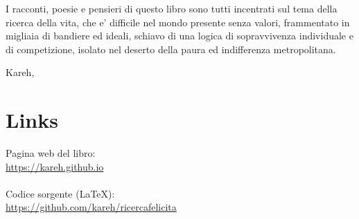 I racconti, poesie e pensieri di questo libro sono tutti incentrati sul tema della ricerca della vita, che e' difficile nel mondo presente senza valori, frammentato in migliaia di bandiere ed ideali, schiavo di una logica di sopravvivenza individuale e di competizione, isolato nel deserto della paura ed indifferenza metropolitana.

\begin{flushright}
    \vspace*{\fill}
    Kareh, \finishDate
\end{flushright}

\section{Links}

Pagina web del libro:\\
\url{https://kareh.github.io}\\

\leavevmode\\
Codice sorgente (LaTeX):\\
\url{https://github.com/kareh/ricercafelicita}

